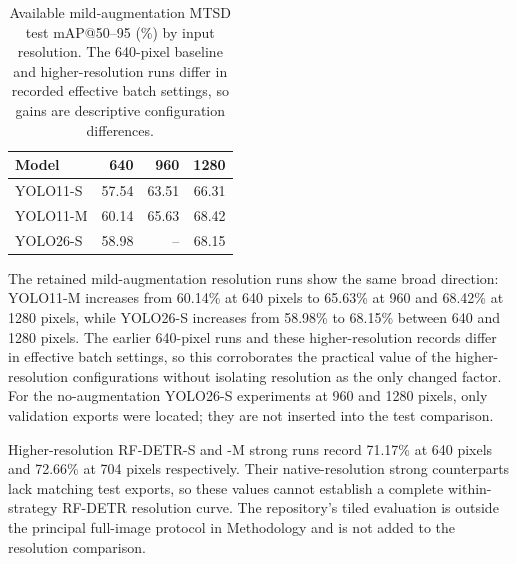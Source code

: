 \begin{table}[htbp]
\centering
\small
\caption{Available mild-augmentation MTSD test \gls{mAP}@50--95 (\%) by input resolution. The 640-pixel baseline and higher-resolution runs differ in recorded effective batch settings, so gains are descriptive configuration differences.}
\label{tab:ev-resolution-mild}
\renewcommand{\arraystretch}{1.15}
\begin{tabularx}{\textwidth}{@{}>{\raggedright\arraybackslash}Xrrr@{}}
\toprule
Model & 640 & 960 & 1280 \\
\midrule
YOLO11-S & 57.54 & 63.51 & 66.31 \\
YOLO11-M & 60.14 & 65.63 & 68.42 \\
YOLO26-S & 58.98 & -- & 68.15 \\
\bottomrule
\end{tabularx}
\end{table}


The retained mild-augmentation resolution runs show the same broad direction: YOLO11-M increases from 60.14\% at 640 pixels to 65.63\% at 960 and 68.42\% at 1280 pixels, while YOLO26-S increases from 58.98\% to 68.15\% between 640 and 1280 pixels. The earlier 640-pixel runs and these higher-resolution records differ in effective batch settings, so this corroborates the practical value of the higher-resolution configurations without isolating resolution as the only changed factor. For the no-augmentation YOLO26-S experiments at 960 and 1280 pixels, only validation exports were located; they are not inserted into the test comparison.

Higher-resolution RF-DETR-S and -M strong runs record 71.17\% at 640 pixels and 72.66\% at 704 pixels respectively. Their native-resolution strong counterparts lack matching test exports, so these values cannot establish a complete within-strategy RF-DETR resolution curve. The repository's tiled evaluation is outside the principal full-image protocol in Methodology and is not added to the resolution comparison.


\clearpage
